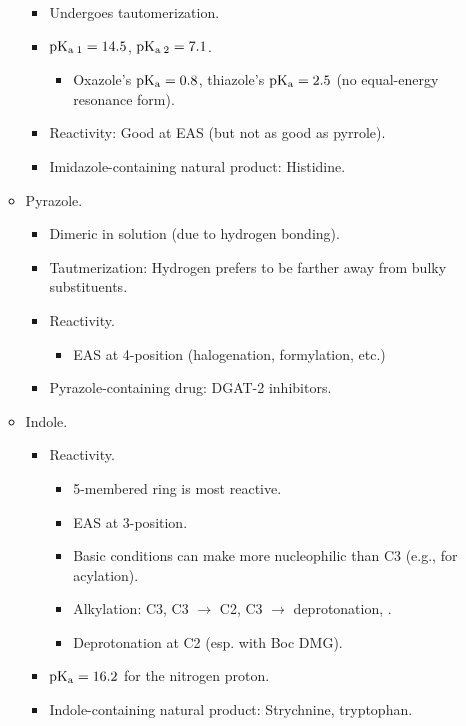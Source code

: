 \documentclass[../notes.tex]{subfiles}
\begin{document}
\begin{itemize}
\begin{itemize}
\begin{itemize}
            \item Undergoes tautomerization.
            \item $\operatorname{\text{p}K_\text{a}}{}_1=14.5$, $\operatorname{\text{p}K_\text{a}}{}_2=7.1$.
            \begin{itemize}
                \item Oxazole's $\operatorname{\text{p}K_\text{a}}=0.8$, thiazole's $\operatorname{\text{p}K_\text{a}}=2.5$ (no equal-energy resonance form).
            \end{itemize}
            \item Reactivity: Good at EAS (but not as good as pyrrole).
            \item Imidazole-containing natural product: Histidine.
        \end{itemize}
        \item Pyrazole.
        \begin{itemize}
            \item Dimeric in solution (due to hydrogen bonding).
            \item Tautmerization: Hydrogen prefers to be farther away from bulky substituents.
            \item Reactivity.
            \begin{itemize}
                \item EAS at 4-position (halogenation, formylation, etc.)
            \end{itemize}
            \item Pyrazole-containing drug: DGAT-2 inhibitors.
        \end{itemize}
        \item Indole.
        \begin{itemize}
            \item Reactivity.
            \begin{itemize}
                \item 5-membered ring is most reactive.
                \item EAS at 3-position.
                \item Basic conditions can make  more nucleophilic than C3 (e.g., for acylation).
                \item Alkylation: C3, C3 $\to$ C2, C3 $\to$ deprotonation, .
                \item Deprotonation at C2 (esp. with Boc DMG).
            \end{itemize}
            \item $\operatorname{\text{p}K_\text{a}}=16.2$ for the nitrogen proton.
            \item Indole-containing natural product: Strychnine, tryptophan.

\end{itemize}
\end{itemize}
\end{itemize}
\end{document}

